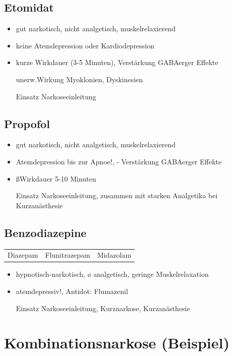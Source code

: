 \documentclass[10pt,a4paper]{report}
\begin{document}
\subsection{Etomidat} %
\label{ssub:etomidat}
\begin{itemize}
	\item gut narkotisch, nicht analgetisch, muskelrelaxierend
	\item keine Atemdepression oder Kardiodepression
 	\item kurze Wirkdauer (3-5 Minuten), Verstärkung GABAerger Effekte
	\item[unerw.Wirkung]Myoklonien, Dyskinesien
	\item[Einsatz]Narkoseeinleitung
\end{itemize}
\subsection{Propofol} %
\label{sub:propofol}
\begin{itemize}
	\item gut narkotisch, nicht analgetisch, muskelrelaxierend
	\item Atemdepression bis zur Apnoe!, - Verstärkung GABAerger Effekte
	\item ßWirkdauer 5-10 Minuten
	\item[Einsatz]Narkoseeinleitung, zusammen mit starken Analgetika bei Kurzanästhesie
\end{itemize}
\subsection{Benzodiazepine} %
\label{sub:benzodiazepine}
\begin{tabularx}{\textwidth}{XXX}
Diazepam&Flunitrazepam&Midazolam\\
\end{tabularx}
\begin{itemize}
	\item hypnotisch-narkotisch, ø analgetisch, geringe Muskelrelaxation
	\item atemdepressiv!, Antidot: Flumazenil
	\item[Einsatz] Narkoseeinleitung,  Kurznarkose, Kurzanästhesie
\end{itemize}
\section{Kombinationsnarkose (Beispiel)} %
\label{sec:kombinationsnarkose_}
\end{document}
